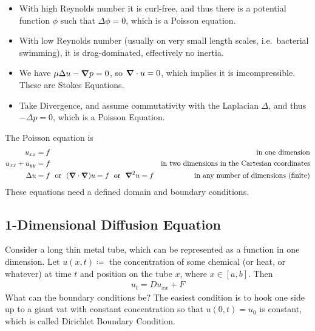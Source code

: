 \documentclass{article}
\begin{document}
\begin{itemize}
\begin{itemize}
                \item With high Reynolds number it is curl-free, and thus there is a potential function $\phi$ such that $\Delta\phi = 0$, which is a Poisson equation.
                \item With low Reynolds number (usually on very small length scales, i.e.~bacterial swimming), it is drag-dominated, effectively no inertia.
                \item We have $\mu\Delta u - \grad p = 0$, so $\grad \cdot u = 0$, which implies it is imcompressible.  These are Stokes Equations.
                \item Take Divergence, and assume commutativity with the Laplacian $\Delta$, and thus $-\Delta p = 0$, which is a Poisson Equation.
            \end{itemize}
        \end{itemize}

        The Poisson equation is
        \begin{align*}
            u_{xx} &= f & \text{in one dimension} \\
            u_{xx} + u_{yy} &= f & \text{in two dimensions in the Cartesian coordinates} \\
            \Delta u &= f\ \ \text{or}\ \ (\grad \cdot \grad) u = f\ \ \text{or}\ \ \grad^2 u = f & \text{in any number of dimensions (finite)}
        \end{align*}
        These equations need a defined domain and boundary conditions.

        \subsection{1-Dimensional Diffusion Equation}
            Consider a long thin metal tube, which can be represented as a function in one dimension.  Let $u(x,t) \coloneqq $ the concentration of some chemical (or heat, or whatever) at time $t$ and position on the tube $x$, where $x \in [a,b]$.  Then
            \begin{align*}
                u_t = D u_{xx} + F
            \end{align*}
            What can the boundary conditions be?  The easiest condition is to hook one side up to a giant vat with constant concentration so that $u(0,t) = u_0$ is constant, which is called Dirichlet Boundary Condition.
\end{document}
